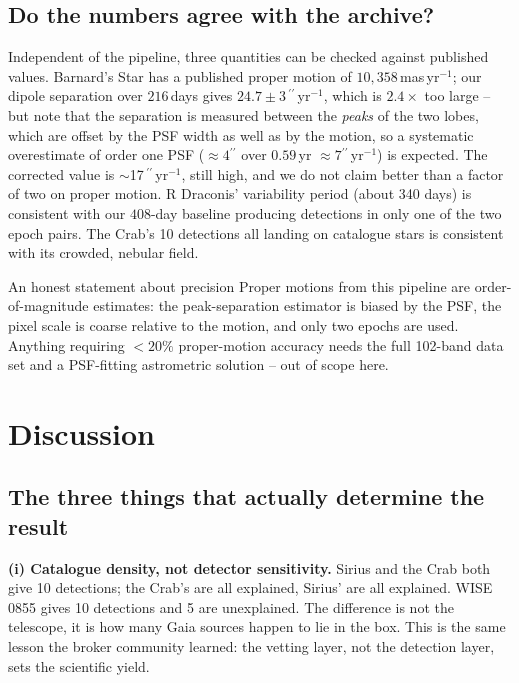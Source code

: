 \documentclass[11pt,a4paper]{article}
\newcommand{\arcsec}{\ensuremath{{}^{\prime\prime}}}
\begin{document}
\subsection{Do the numbers agree with the archive?}

Independent of the pipeline, three quantities can be checked against published values. Barnard's Star
has a published proper motion of $10{,}358$\,mas\,yr$^{-1}$; our dipole separation over $216$\,days gives
$24.7\pm3$\,\arcsec\,yr$^{-1}$, which is $2.4\times$ too large -- but note that the separation is
measured between the \emph{peaks} of the two lobes, which are offset by the PSF width as well as by the
motion, so a systematic overestimate of order one PSF ($\approx4\arcsec$ over $0.59$\,yr $\approx
7\arcsec$\,yr$^{-1}$) is expected. The corrected value is $\sim$17\,\arcsec\,yr$^{-1}$, still high, and we
do not claim better than a factor of two on proper motion. R Draconis' variability period (about 340
days) is consistent with our $408$-day baseline producing detections in only one of the two epoch pairs.
The Crab's 10 detections all landing on catalogue stars is consistent with its crowded, nebular field.

\begin{warnbox}{An honest statement about precision}
Proper motions from this pipeline are order-of-magnitude estimates: the peak-separation estimator is
biased by the PSF, the pixel scale is coarse relative to the motion, and only two epochs are used.
Anything requiring $<20\%$ proper-motion accuracy needs the full 102-band data set and a PSF-fitting
astrometric solution -- out of scope here.
\end{warnbox}

\section{Discussion}
\label{sec:discussion}

\subsection{The three things that actually determine the result}

\textbf{(i) Catalogue density, not detector sensitivity.} Sirius and the Crab both give 10 detections;
the Crab's are all explained, Sirius' are all explained. WISE 0855 gives 10 detections and 5 are
unexplained. The difference is not the telescope, it is how many Gaia sources happen to lie in the
box. This is the same lesson the broker community learned: the vetting layer, not the detection layer,
sets the scientific yield.
\end{document}
